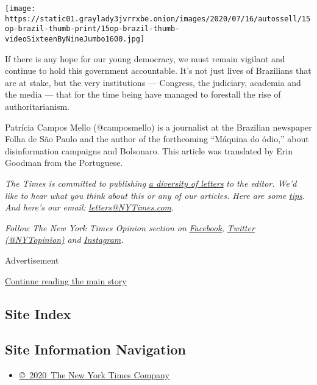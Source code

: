 \texttt{[image: https://static01.graylady3jvrrxbe.onion/images/2020/07/16/autossell/15op-brazil-thumb-print/15op-brazil-thumb-videoSixteenByNineJumbo1600.jpg]}

If there is any hope for our young democracy, we must remain vigilant
and continue to hold this government accountable. It's not just lives of
Brazilians that are at stake, but the very institutions --- Congress,
the judiciary, academia and the media --- that for the time being have
managed to forestall the rise of authoritarianism.

Patrícia Campos Mello (@camposmello) is a journalist at the Brazilian
newspaper Folha de São Paulo and the author of the forthcoming ``Máquina
do ódio,'' about disinformation campaigns and Bolsonaro. This article
was translated by Erin Goodman from the Portuguese.

\emph{The Times is committed to publishing}
\href{https://www.nytimes3xbfgragh.onion/2019/01/31/opinion/letters/letters-to-editor-new-york-times-women.html}{\emph{a
diversity of letters}} \emph{to the editor. We'd like to hear what you
think about this or any of our articles. Here are some}
\href{https://help.nytimes3xbfgragh.onion/hc/en-us/articles/115014925288-How-to-submit-a-letter-to-the-editor}{\emph{tips}}\emph{.
And here's our email:}
\href{mailto:letters@NYTimes.com}{\emph{letters@NYTimes.com}}\emph{.}

\emph{Follow The New York Times Opinion section on}
\href{https://www.facebookcorewwwi.onion/nytopinion}{\emph{Facebook}}\emph{,}
\href{http://twitter.com/NYTOpinion}{\emph{Twitter (@NYTopinion)}}
\emph{and}
\href{https://www.instagram.com/nytopinion/}{\emph{Instagram}}\emph{.}

Advertisement

\protect\hyperlink{after-bottom}{Continue reading the main story}

\hypertarget{site-index}{%
\subsection{Site Index}\label{site-index}}

\hypertarget{site-information-navigation}{%
\subsection{Site Information
Navigation}\label{site-information-navigation}}

\begin{itemize}
\tightlist
\item
  \href{https://help.nytimes3xbfgragh.onion/hc/en-us/articles/115014792127-Copyright-notice}{©~2020~The
  New York Times Company}
\end{itemize}

